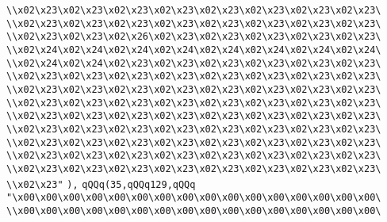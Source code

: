 \verb|\\x02\x23\x02\x23\x02\x23\x02\x23\x02\x23\x02\x23\x02\x23\x02\x23\|\newline
\verb|\\x02\x23\x02\x23\x02\x23\x02\x23\x02\x23\x02\x23\x02\x23\x02\x23\|\newline
\verb|\\x02\x23\x02\x23\x02\x26\x02\x23\x02\x23\x02\x23\x02\x23\x02\x23\|\newline
\verb|\\x02\x24\x02\x24\x02\x24\x02\x24\x02\x24\x02\x24\x02\x24\x02\x24\|\newline
\verb|\\x02\x24\x02\x24\x02\x23\x02\x23\x02\x23\x02\x23\x02\x23\x02\x23\|\newline
\verb|\\x02\x23\x02\x23\x02\x23\x02\x23\x02\x23\x02\x23\x02\x23\x02\x23\|\newline
\verb|\\x02\x23\x02\x23\x02\x23\x02\x23\x02\x23\x02\x23\x02\x23\x02\x23\|\newline
\verb|\\x02\x23\x02\x23\x02\x23\x02\x23\x02\x23\x02\x23\x02\x23\x02\x23\|\newline
\verb|\\x02\x23\x02\x23\x02\x23\x02\x23\x02\x23\x02\x23\x02\x23\x02\x23\|\newline
\verb|\\x02\x23\x02\x23\x02\x23\x02\x23\x02\x23\x02\x23\x02\x23\x02\x23\|\newline
\verb|\\x02\x23\x02\x23\x02\x23\x02\x23\x02\x23\x02\x23\x02\x23\x02\x23\|\newline
\verb|\\x02\x23\x02\x23\x02\x23\x02\x23\x02\x23\x02\x23\x02\x23\x02\x23\|\newline
\verb|\\x02\x23\x02\x23\x02\x23\x02\x23\x02\x23\x02\x23\x02\x23\x02\x23\|\newline
\verb|\\x02\x23"|\newline
\verb|),|\newline
\verb|qQQq(35,qQQq129,qQQq|\newline
\verb|"\x00\x00\x00\x00\x00\x00\x00\x00\x00\x00\x00\x00\x00\x00\x00\x00\|\newline
\verb|\\x00\x00\x00\x00\x00\x00\x00\x00\x00\x00\x00\x00\x00\x00\x00\x00\|\newline
